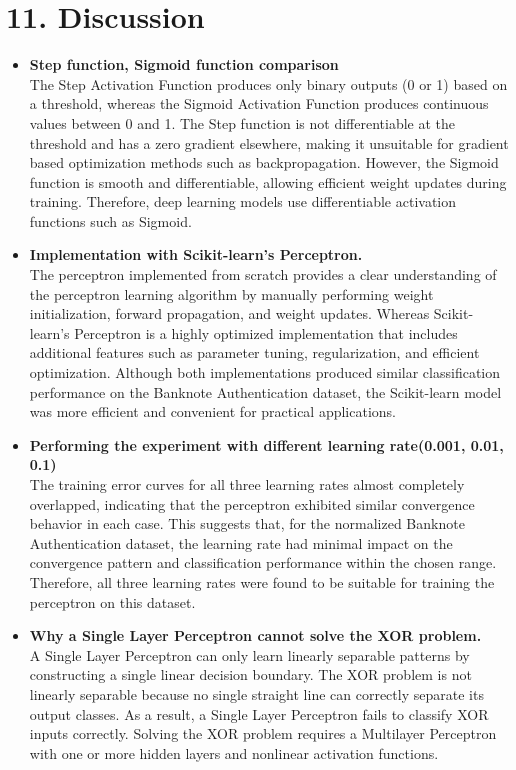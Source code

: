 \documentclass[11pt]{article}
\begin{document}
\section*{11. Discussion}

\begin{itemize}
    \item {\textbf{Step function, Sigmoid function comparison}}\\
    The Step Activation Function produces only binary outputs (0 or 1) based on a threshold, whereas the Sigmoid Activation Function produces continuous values between 0 and 1. The Step function is not differentiable at the threshold and has a zero gradient elsewhere, making it unsuitable for gradient based optimization methods such as backpropagation. However, the Sigmoid function is smooth and differentiable, allowing efficient weight updates during training. Therefore, deep learning models use differentiable activation functions such as Sigmoid.
    \item {\textbf{Implementation with Scikit-learn's Perceptron.}}\\
    The perceptron implemented from scratch provides a clear understanding of the perceptron learning algorithm by manually performing weight initialization, forward propagation, and weight updates. Whereas Scikit-learn's Perceptron is a highly optimized implementation that includes additional features such as parameter tuning, regularization, and efficient optimization. Although both implementations produced similar classification performance on the Banknote Authentication dataset, the Scikit-learn model was more efficient and convenient for practical applications.
    \item {\textbf{Performing the experiment with different learning rate(0.001, 0.01, 0.1)}}\\
    The training error curves for all three learning rates almost completely overlapped, indicating that the perceptron exhibited similar convergence behavior in each case. This suggests that, for the normalized Banknote Authentication dataset, the learning rate had minimal impact on the convergence pattern and classification performance within the chosen range. Therefore, all three learning rates were found to be suitable for training the perceptron on this dataset.
    \item {\textbf{Why a Single Layer Perceptron cannot solve the XOR problem.}}\\
    A Single Layer Perceptron can only learn linearly separable patterns by constructing a single linear decision boundary. The XOR problem is not linearly separable because no single straight line can correctly separate its output classes. As a result, a Single Layer Perceptron fails to classify XOR inputs correctly. Solving the XOR problem requires a Multilayer Perceptron with one or more hidden layers and nonlinear activation functions.

\end{itemize}
\end{document}
